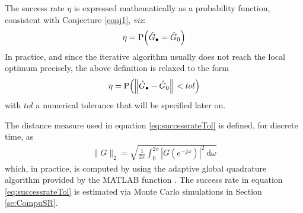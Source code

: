 
The success rate $\eta$ is expressed mathematically as a probability function, consistent with Conjecture \ref{conj1}, \emph{viz}:
\begin{align}
\eta=\mathrm{P}\!\left( \hat G_\bullet=\hat G_0 \right)
\end{align}
In practice, and since the iterative algorithm usually does not reach the local optimum precisely, the above definition is relaxed to the form
\begin{align}\label{eq:successrateTol}
\eta=\mathrm{P}\!\left(  \left\| \hat G_\bullet-\hat G_0 \right\|_{} < tol \right)
\end{align}
with $tol$ a numerical tolerance that will be specified later on.




The distance measure used in equation \eqref{eq:successrateTol} is defined, for discrete time, as
\begin{align}
\|G\|_2 = \sqrt{\frac{1}{2\pi}\int_0^{2\pi} |G(e^{-j\omega})|^2\ \mathrm{d}\omega}
\end{align}
 which, in practice, is computed by using the adaptive global quadrature algorithm provided by the MATLAB function .
The success rate in equation \eqref{eq:successrateTol} is estimated via Monte Carlo simulations in  Section \ref{se:CompuSR}.


